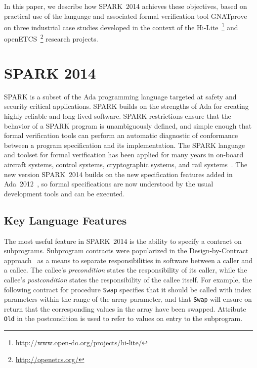 \documentclass[10pt,a4paper,twocolumn]{article}
\newcommand{\hilite}{Hi-Lite\xspace}
\newcommand{\openetcs}{openETCS\xspace}
\newcommand{\gnatprove}{GNATprove\xspace}
\newcommand{\newspark}{SPARK~2014\xspace}
\newcommand{\adatwtw}{Ada~2012\xspace}
\newcommand{\SPARK}[1]{\lstinline[language=Ada,basicstyle={\footnotesize
      \sffamily},framesep=0pt]$#1$}
\begin{document}
In this paper, we describe how \newspark achieves these objectives, based on
practical use of the language and associated formal verification tool
\gnatprove on three industrial case studies developed in the context of the
\hilite~\footnote{\url{http://www.open-do.org/projects/hi-lite/}} and
\openetcs~\footnote{\url{http://openetcs.org/}} research projects.

\section{SPARK 2014}


SPARK is a subset of the Ada programming language targeted at safety and
security critical applications. SPARK builds on the strengths of Ada for
creating highly reliable and long-lived software. SPARK restrictions ensure
that the behavior of a SPARK program is unambiguously defined, and simple
enough that formal verification tools can perform an automatic diagnostic of
conformance between a program specification and its implementation. The SPARK
language and toolset for formal verification has been applied for many years in
on-board aircraft systems, control systems, cryptographic systems, and rail
systems~\cite{sparkbook2012,oneill2012}. The new version \newspark builds on
the new specification features added in \adatwtw~\cite{ada2012rationale}, so
formal specifications are now understood by the usual development tools and can
be executed.

\subsection{Key Language Features}

The most useful feature in \newspark is the ability to specify a contract on
subprograms. Subprogram contracts were popularized in the Design-by-Contract
approach~\cite{meyer:1988:OSC} as a means to separate responsibilities in
software between a caller and a callee. The callee's \textit{precondition}
states the responsibility of its caller, while the callee's
\textit{postcondition} states the responsibility of the callee itself.  For
example, the following contract for procedure \SPARK{Swap} specifies that it
should be called with index parameters within the range of the array parameter,
and that \SPARK{Swap} will ensure on return that the corresponding values in
the array have been swapped. Attribute \SPARK{Old} in the postcondition is used
to refer to values on entry to the subprogram.
\end{document}
